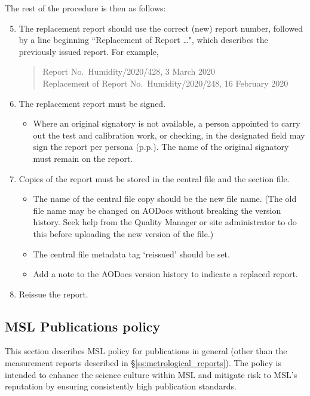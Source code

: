 The rest of the procedure is then as follows: 
\begin{enumerate}
\setcounter{enumi}{4}
\item The replacement report should use the correct (new) report number, followed by a line beginning ``Replacement of Report \ldots", which describes the previously issued report. For example, 
\begin{quote}
Report No.\ Humidity/2020/428, 3 March 2020\\
 Replacement of Report No.\ Humidity/2020/248, 16 February 2020
\end{quote}

\item The replacement report must be signed.
\begin{itemize}
\item Where an original signatory is not available, a person appointed to carry out the test and calibration work, or checking, in the designated field may sign the report per persona (p.p.).  The name of the original signatory must remain on the report.
\end{itemize}

\item Copies of the report must be stored in the central file and the section file.
\begin{itemize}
\item The name of the central file copy should be the new file name. (The old file name may be changed on AODocs without breaking the version history. Seek help from the Quality Manager or site administrator to do this before uploading the new version of the file.) 
\item The central file metadata tag `reissued' should be set.
\item Add a note to the AODocs version history to indicate a replaced report.
\end{itemize}
\item Reissue the report.

\end{enumerate}



\subsection{MSL Publications policy}
\label{ss:msl_publications_policy}

This section describes MSL policy for publications in general (other than the measurement reports described in \S\ref{ss:metrological_reports}). The policy is intended to enhance the science culture within MSL and mitigate risk to MSL's reputation by ensuring consistently high publication standards.   


